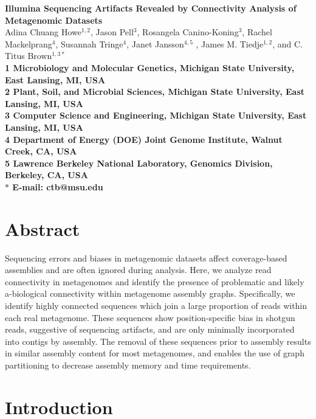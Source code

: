 \documentclass[10pt]{article}
\date{}
\begin{document}
\begin{flushleft}
{\Large \textbf{Illumina Sequencing Artifacts Revealed by Connectivity
    Analysis of Metagenomic Datasets} }
\\
Adina Chuang Howe$^{1,2}$, 
Jason Pell$^{3}$,
Rosangela Canino-Koning$^{3}$,
Rachel Mackelprang$^{4}$,
Susannah Tringe$^{4}$,
Janet Jansson$^{4,5}$ ,
James M. Tiedje$^{1,2}$, and 
C. Titus Brown$^{1,3\ast}$
\\
\bf{1} Microbiology and Molecular Genetics, Michigan State University, East Lansing, MI, USA
\\
\bf{2} Plant, Soil, and Microbial Sciences, Michigan State University, East Lansing, MI, USA
\\
\bf{3} Computer Science and Engineering, Michigan State University, East Lansing, MI, USA
\\
\bf{4} Department of Energy (DOE) Joint Genome Institute, Walnut Creek, CA, USA
\\
\bf{5} Lawrence Berkeley National Laboratory, Genomics Division, Berkeley, CA, USA
\\
$\ast$ E-mail: ctb@msu.edu
\end{flushleft}

\section*{Abstract}

Sequencing errors and biases in metagenomic datasets affect
coverage-based assemblies and are often ignored during analysis.
Here, we analyze read connectivity in metagenomes and identify the
presence of problematic and likely a-biological connectivity within
metagenome assembly graphs.  Specifically, we identify highly
connected sequences which join a large proportion of reads within each
real metagenome.  These sequences show position-specific bias in
shotgun reads, suggestive of sequencing artifacts, and are only
minimally incorporated into contigs by assembly.  The removal of these
sequences prior to assembly results in similar assembly content for
most metagenomes, and enables the use of graph partitioning to
decrease assembly memory and time requirements.

\section*{Introduction}
\end{document}

